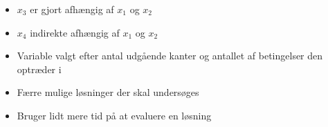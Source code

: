 \documentclass[smaller,handouts]{beamer}
\newcommand{\vertex}{\node[vertex]}
\def\Arrow{{\scalebox{2}{$\Rightarrow$}}}
\begin{document}
\begin{frame}
\begin{columns}[T]
\begin{column}[T]{.55\textwidth}
\begin{itemize}[<+->]
\item $x_3$ er gjort afhængig af $x_1$ og $x_2$
\item $x_4$ indirekte afhængig af $x_1$ og $x_2$
\item Variable valgt efter antal udgående kanter og antallet af betingelser den optræder i
\item \alert{Færre mulige løsninger der skal undersøges}
\item Bruger lidt mere tid på at evaluere en løsning
\end{itemize}
\end{column}


 
\end{columns}

\end{frame}
\end{document}
